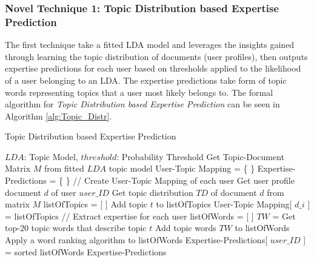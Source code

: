         \subsubsection{Novel Technique 1: Topic Distribution based Expertise Prediction}
            The first technique take a fitted LDA model and leverages the insights gained through learning the topic distribution of documents (user profiles), then outputs expertise predictions for each user based on thresholds applied to the likelihood of a user belonging to an LDA. The expertise predictions take form of topic words representing topics that a user most likely belongs to. The formal algorithm for \emph{Topic Distribution based Expertise Prediction} can be seen in Algorithm \ref{alg:Topic_Distr}.
            
            \begin{algorithm}
            \caption{Topic Distribution based Expertise Prediction}
            \label{alg:Topic_Distr}
            \begin{algorithmic}[1]
                \REQUIRE $LDA$: Topic Model, $threshold$: Probability Threshold
                \STATE Get Topic-Document Matrix $M$ from fitted $LDA$ topic model
                \STATE User-Topic Mapping = \{ \}
                \STATE Expertise-Predictions = \{ \}
                \STATE
                \STATE // Create User-Topic Mapping of each user
                    \STATE Get user profile document $d$ of user $user\_ID$
                    \STATE Get topic distribution $TD$ of document $d$ from matrix $M$
                    \STATE listOfTopics = [ ]
                            \STATE Add topic $t$ to listOfTopics
                        \ENDIF
                    \ENDFOR
                    \STATE User-Topic Mapping[ $d\_i$ ] = listOfTopics
                    \STATE
                    \STATE // Extract expertise for each user
                    \STATE listOfWords = [ ]
                        \STATE $TW$ = Get top-20 topic words that describe topic $t$
                        \STATE Add topic words $TW$ to listOfWords
                    \ENDFOR
                    \STATE Apply a word ranking algorithm to listOfWords
                    \STATE Expertise-Predictions[ $user\_ID$ ] = sorted listOfWords
                \ENDFOR
                \RETURN Expertise-Predictions
            \end{algorithmic}
            \end{algorithm}
            
